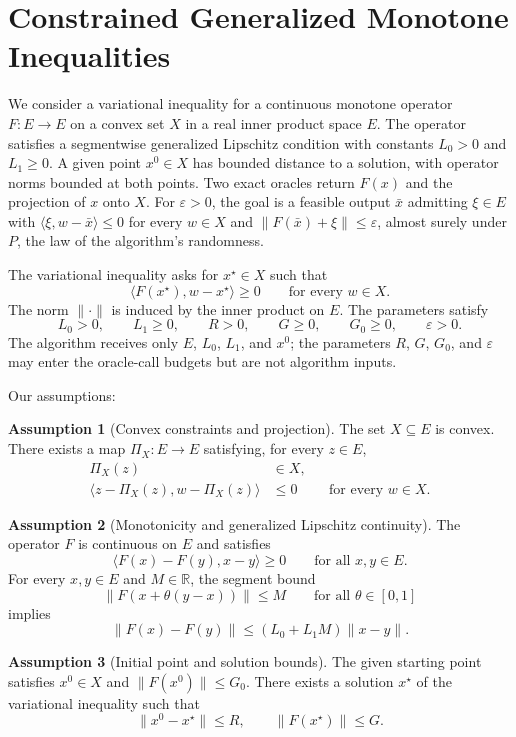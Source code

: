 \documentclass[10pt]{article}
\theoremstyle{definition}
\newtheorem{assumption}{Assumption}
\begin{document}
\section*{Constrained Generalized Monotone Inequalities}
We consider a variational inequality for a continuous monotone operator $F:E\to E$ on a convex set $X$ in a real inner product space $E$. The operator satisfies a segmentwise generalized Lipschitz condition with constants $L_0>0$ and $L_1\geq0$. A given point $x^0\in X$ has bounded distance to a solution, with operator norms bounded at both points. Two exact oracles return $F(x)$ and the projection of $x$ onto $X$. For $\varepsilon>0$, the goal is a feasible output $\bar{x}$ admitting $\xi\in E$ with $\langle\xi,w-\bar{x}\rangle\leq0$ for every $w\in X$ and $\|F(\bar{x})+\xi\|\leq\varepsilon$, almost surely under $P$, the law of the algorithm's randomness.

The variational inequality asks for $x^\star\in X$ such that
\[
\langle F(x^\star),w-x^\star\rangle\geq0
\qquad\text{for every }w\in X.
\]
The norm $\|\cdot\|$ is induced by the inner product on $E$. The parameters satisfy
\[
L_0>0,\qquad L_1\geq0,\qquad R>0,\qquad
G\geq0,\qquad G_0\geq0,\qquad \varepsilon>0.
\]
The algorithm receives only $E$, $L_0$, $L_1$, and $x^0$; the parameters $R$, $G$, $G_0$, and $\varepsilon$ may enter the oracle-call budgets but are not algorithm inputs.

Our assumptions:
\begin{assumption}[Convex constraints and projection]
The set $X\subseteq E$ is convex. There exists a map $\Pi_X:E\to E$ satisfying, for every $z\in E$,
\[
\begin{aligned}
\Pi_X(z)&\in X,\\
\langle z-\Pi_X(z),w-\Pi_X(z)\rangle&\leq0
&&\text{for every }w\in X.
\end{aligned}
\]
\end{assumption}

\begin{assumption}[Monotonicity and generalized Lipschitz continuity]
The operator $F$ is continuous on $E$ and satisfies
\[
\langle F(x)-F(y),x-y\rangle\geq0
\qquad\text{for all }x,y\in E.
\]
For every $x,y\in E$ and $M\in\mathbb{R}$, the segment bound
\[
\|F(x+\theta(y-x))\|\leq M
\qquad\text{for all }\theta\in[0,1]
\]
implies
\[
\|F(x)-F(y)\|\leq(L_0+L_1M)\|x-y\|.
\]
\end{assumption}

\begin{assumption}[Initial point and solution bounds]
The given starting point satisfies $x^0\in X$ and $\|F(x^0)\|\leq G_0$. There exists a solution $x^\star$ of the variational inequality such that
\[
\|x^0-x^\star\|\leq R,
\qquad
\|F(x^\star)\|\leq G.
\]
\end{assumption}
\end{document}
